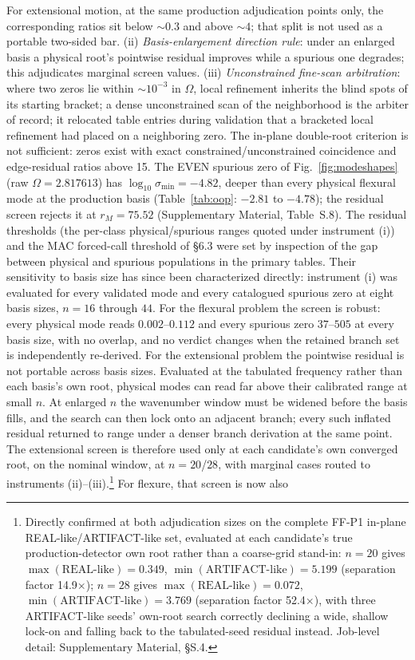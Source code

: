 \documentclass[11pt]{article}
\begin{document}
For extensional motion, at the same production adjudication points only,
the corresponding ratios sit below ${\sim}0.3$ and above ${\sim}4$; that
split is not used as a portable two-sided bar.
(ii) \emph{Basis-enlargement direction rule}: under an enlarged basis a
physical root's pointwise residual improves while a spurious one degrades;
this adjudicates marginal screen values.
(iii) \emph{Unconstrained fine-scan arbitration}: where two zeros lie
within $\sim10^{-3}$ in $\Omega$, local refinement inherits the blind spots
of its starting bracket; a dense unconstrained scan of the neighborhood is
the arbiter of record; it relocated table entries during validation that a
bracketed local refinement had placed on a neighboring zero.
The in-plane double-root criterion is not sufficient: zeros exist with
exact constrained/unconstrained coincidence and edge-residual ratios
above 15. The EVEN spurious zero of Fig.~\ref{fig:modeshapes} (raw
$\Omega=2.817613$) has $\log_{10}\sigma_{\min}=-4.82$, deeper than every
physical flexural mode at the production basis (Table~\ref{tab:oop}:
$-2.81$ to $-4.78$); the residual screen rejects it at $r_M=75.52$
(Supplementary Material, Table~S.8).
The residual thresholds
(the per-class physical/spurious ranges quoted under instrument (i)) and the
MAC forced-call threshold of \S6.3 were set by inspection of the gap
between physical and spurious populations in the primary tables. Their sensitivity
to basis size has since been characterized directly: instrument (i) was
evaluated for every validated mode and every catalogued spurious zero at
eight basis sizes, $n=16$ through $44$. For the flexural problem the
screen is robust: every physical mode reads $0.002$--$0.112$ and every
spurious zero $37$--$505$ at every basis size, with no overlap, and no
verdict changes when the retained branch set is independently re-derived.
For the extensional problem the pointwise residual is not portable across
basis sizes. Evaluated at the tabulated frequency rather than each
basis's own root, physical modes can read far above their calibrated
range at small $n$. At enlarged $n$ the wavenumber window must be widened
before the basis fills, and the search can then lock onto an adjacent
branch; every such inflated residual returned to range under a denser
branch derivation at the same point. The extensional screen is therefore
used only at each candidate's own converged root, on the nominal window,
at $n=20$/$28$, with marginal cases routed to instruments (ii)--(iii).\footnote{Directly confirmed
at both adjudication sizes on the complete FF-P1 in-plane REAL-like/ARTIFACT-like
set, evaluated at each candidate's true production-detector own root
rather than a coarse-grid stand-in: $n=20$ gives
$\max(\mathrm{REAL\textrm{-}like})=0.349$, $\min(\mathrm{ARTIFACT\textrm{-}like})=5.199$ (separation
factor 14.9$\times$); $n=28$ gives $\max(\mathrm{REAL\textrm{-}like})=0.072$,
$\min(\mathrm{ARTIFACT\textrm{-}like})=3.769$ (separation factor 52.4$\times$), with
three ARTIFACT-like seeds' own-root search correctly declining a wide,
shallow lock-on and falling back to the tabulated-seed residual instead.
Job-level detail: Supplementary Material, §S.4.} For flexure, that screen is now also
\end{document}
